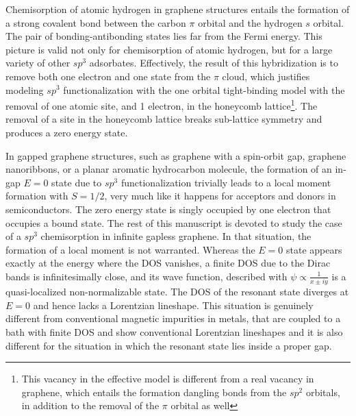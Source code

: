 \documentclass[aps,prb,twocolumn,superscriptaddress]{revtex4-1}
\begin{document}
Chemisorption of atomic hydrogen in graphene structures entails the formation
of a strong covalent bond between the carbon $\pi$ orbital and the hydrogen $s$
orbital. The pair of bonding-antibonding states lies far from the Fermi energy.
This picture is valid not only for chemisorption of atomic hydrogen, but for a
large variety of other  $sp^3$ adsorbates. \cite{santos2012}
Effectively, the result of this  hybridization is to remove both one electron
and one state from the $\pi$ cloud, which justifies modeling $sp^3$
functionalization with the one orbital tight-binding model with the removal of
one atomic site, and 1 electron, in the honeycomb lattice\footnote{This vacancy
in the effective model is different from a real vacancy in graphene, which
entails the formation dangling bonds from the $sp^2$ orbitals, in addition to
the removal of the $\pi$ orbital as well}.
The removal of a site in the honeycomb lattice breaks sub-lattice symmetry and produces a zero energy state.\cite{Pereira2006,kumazaki2007,Wehling2007,Pereira2008,Palacios2008}

In gapped graphene structures, such as graphene with a spin-orbit gap,
\cite{Gonzalez2012} graphene nanoribbons,\cite{Palacios2008} or a planar
aromatic hydrocarbon molecule, the formation of an in-gap $E=0$ state due to
$sp^3$ functionalization trivially leads to a local moment formation with
$S=1/2$, very much like it happens for acceptors and donors in semiconductors.
The zero energy state is singly occupied by one electron
that occupies a bound state.
The rest of this manuscript is devoted to study the case of a $sp^3$ chemisorption in infinite gapless graphene. In that situation, the formation of a local moment is not warranted. Whereas the $E=0$  state appears exactly at the energy where the DOS vanishes, a finite DOS due to the Dirac bands is infinitesimally close, and its wave function, described with $\psi\propto\frac{1}{x\pm i y}$ is a quasi-localized non-normalizable state.\cite{Pereira2006}
The DOS of the resonant state diverges at $E=0$ and hence lacks a Lorentzian lineshape.   %
This situation is genuinely different from conventional magnetic impurities in metals, that are coupled to a bath with finite DOS and show conventional Lorentzian lineshapes and it is also different for the situation in which the resonant state lies inside a proper gap.
\end{document}
